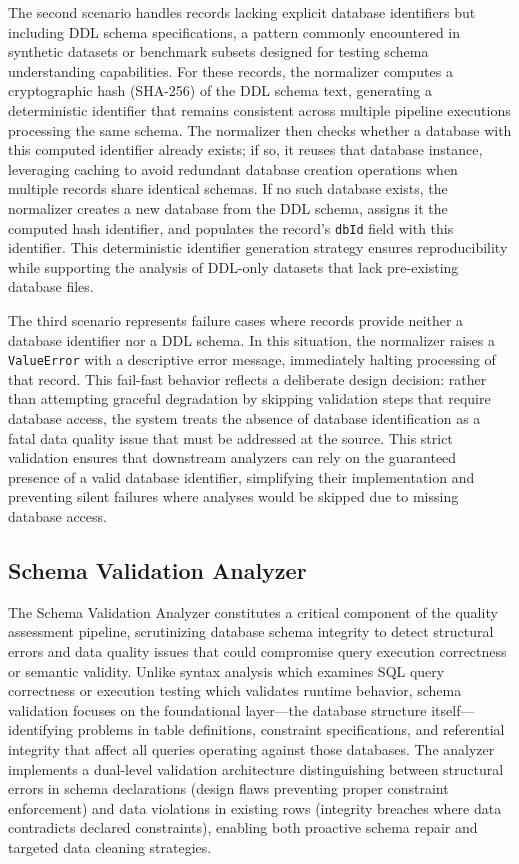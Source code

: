 \documentclass[print]{einformatica}
\begin{document}
The second scenario handles records lacking explicit database identifiers but including DDL schema specifications, a pattern commonly encountered in synthetic datasets or benchmark subsets designed for testing schema understanding capabilities. For these records, the normalizer computes a cryptographic hash (SHA-256) of the DDL schema text, generating a deterministic identifier that remains consistent across multiple pipeline executions processing the same schema. The normalizer then checks whether a database with this computed identifier already exists; if so, it reuses that database instance, leveraging caching to avoid redundant database creation operations when multiple records share identical schemas. If no such database exists, the normalizer creates a new database from the DDL schema, assigns it the computed hash identifier, and populates the record's \texttt{dbId} field with this identifier. This deterministic identifier generation strategy ensures reproducibility while supporting the analysis of DDL-only datasets that lack pre-existing database files.

The third scenario represents failure cases where records provide neither a database identifier nor a DDL schema. In this situation, the normalizer raises a \texttt{ValueError} with a descriptive error message, immediately halting processing of that record. This fail-fast behavior reflects a deliberate design decision: rather than attempting graceful degradation by skipping validation steps that require database access, the system treats the absence of database identification as a fatal data quality issue that must be addressed at the source. This strict validation ensures that downstream analyzers can rely on the guaranteed presence of a valid database identifier, simplifying their implementation and preventing silent failures where analyses would be skipped due to missing database access.

\subsection{Schema Validation Analyzer}\label{sec:schema_analyzer}

The Schema Validation Analyzer constitutes a critical component of the quality assessment pipeline, scrutinizing database schema integrity to detect structural errors and data quality issues that could compromise query execution correctness or semantic validity. Unlike syntax analysis which examines SQL query correctness or execution testing which validates runtime behavior, schema validation focuses on the foundational layer---the database structure itself---identifying problems in table definitions, constraint specifications, and referential integrity that affect all queries operating against those databases. The analyzer implements a dual-level validation architecture distinguishing between structural errors in schema declarations (design flaws preventing proper constraint enforcement) and data violations in existing rows (integrity breaches where data contradicts declared constraints), enabling both proactive schema repair and targeted data cleaning strategies.
\end{document}
